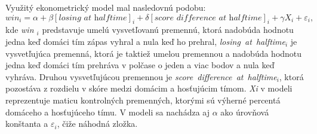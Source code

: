 \documentclass[
  digital, %
  oneside, %
  notable,   %
  lof,     %
  lot,     %
]{fithesis3}
\begin{document}
		Využitý ekonometrický model mal nasledovnú podobu:
		\begin{equation}
		win_{i} = \alpha + \beta [\textit{losing~at~halftime}]_{i} + \delta [\textit{score~difference~at~halftime}]_{i} + \gamma X_{i} + \varepsilon_{i},
		\end{equation}
		kde \textit{ win $ _{i} $} predstavuje umelú vysvetľovanú premennú, ktorá nadobúda hodnotu jedna keď domáci tím zápas vyhral a nula keď ho prehral, \textit{losing~at~halftime$ _{i} $} je vysvetľujúca premenná, ktorá je taktiež umelou premennou a nadobúda hodnotu jedna keď domáci tím prehráva v polčase o jeden a viac bodov a nula keď vyhráva. Druhou vysvetľujúcou premennou je \textit{score~difference~at~halftime$ _{i} $}, ktorá pozostáva z rozdielu v skóre medzi domácim a hosťujúcim tímom. \textit{Xi} v modeli reprezentuje maticu kontrolných premenných, ktorými sú výherné percentá domáceho a hosťujúceho tímu.  V modeli sa nachádza aj $\alpha$ ako úrovňová konštanta a $\varepsilon_{i}$, čiže náhodná zložka.
	
\end{document}
